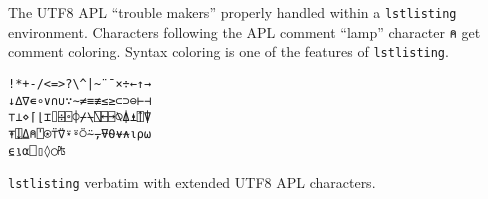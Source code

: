 \documentclass{article}
\begin{document}
\vspace{1cm}


\begin{minipage}{0.75\linewidth}

\Large

The UTF8 APL ``trouble makers'' properly handled within
a \verb|lstlisting| environment. Characters following
the APL comment ``lamp'' character   
\verb|⍝| get comment coloring. Syntax coloring
is one of the features of \verb|lstlisting|.

\centering

\begin{lstlisting}[language=apl,extendedchars=true,
basicstyle=\ttfamily\Huge\color{red},frame=shadowbox,
rulesepcolor=\color{blue},framexleftmargin=10mm]
!*+-/<=>?\^|~¨¯×÷←↑→                              
↓∆∇∊∘∨∩∪∵∼≠≡≢≤≥⊂⊃⊖⊢⊣
⊤⊥⋄⌈⌊⌶⌷⌹⌻⌽⌿⍀⍂⍇⍈⍉⍋⍎⍐⍒
⍕⍗⍙⍝⍞⍟⍡⍢⍣⍤⍥⍨⍪⍫⍬⍱⍲⍳⍴⍵
⍷⍸⍺⎕▯◊○₧
\end{lstlisting}
\end{minipage}

\vspace{1cm}

\texttt{lstlisting} verbatim with extended UTF8 APL characters.
\end{document}
